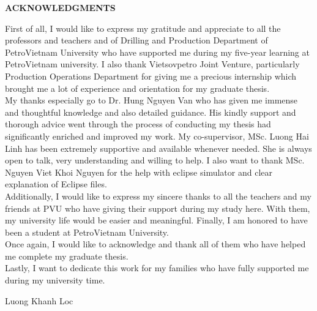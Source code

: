 \documentclass[12pt,a4paper]{report}
\begin{document}
\newpage

\begin{center}
	\centering
	\textbf{ACKNOWLEDGMENTS}
\end{center}

First of all, I would like to express my gratitude and appreciate to all the professors and teachers and of Drilling and Production Department of PetroVietnam University who have supported me during my five-year learning at PetroVietnam university. I also thank Vietsovpetro Joint Venture, particularly Production Operations Department for giving me a precious internship which brought me a lot of experience and orientation for my graduate thesis.\\
My thanks especially go to Dr. Hung Nguyen Van who has given me immense and thoughtful knowledge and also detailed guidance. His kindly support and thorough advice went through the process of conducting my thesis had significantly enriched and improved my work. My co-supervisor, MSc. Luong Hai Linh has been extremely supportive and available whenever needed. She is always open to talk, very understanding and willing to help. I also want to thank MSc. Nguyen Viet Khoi Nguyen for the help with eclipse simulator and clear explanation of Eclipse files.\\
Additionally, I would like to express my sincere thanks to all the teachers and my friends at PVU who have giving their support during my study here. With them, my university life would be easier and meaningful. Finally, I am honored to have been a student at PetroVietnam University.\\
Once again, I would like to acknowledge and thank all of them who have helped me complete my graduate thesis.\\
Lastly, I want to dedicate this work for my families who have fully supported me during my university time.
\begin{flushright}
Luong Khanh Loc
\end{flushright}


\newpage

\tableofcontents
{}


\listoftables
{}
\end{document}
